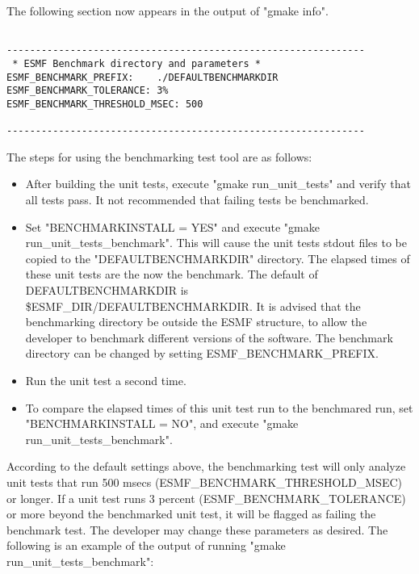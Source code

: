 The following section now appears in the output of "gmake info".

\begin{verbatim}
 
--------------------------------------------------------------
 * ESMF Benchmark directory and parameters *
ESMF_BENCHMARK_PREFIX:    ./DEFAULTBENCHMARKDIR
ESMF_BENCHMARK_TOLERANCE: 3%
ESMF_BENCHMARK_THRESHOLD_MSEC: 500
 
--------------------------------------------------------------

\end{verbatim}

The steps for using the benchmarking test tool are as follows:

\begin{sloppypar}
\begin{itemize}
\item After building the unit tests, execute "gmake run\_unit\_tests" and 
verify that all tests pass. It not recommended that failing tests be benchmarked.
\item Set "BENCHMARKINSTALL = YES" and execute "gmake run\_unit\_tests\_benchmark".
This will cause the unit tests stdout files to be copied to the "DEFAULTBENCHMARKDIR"
directory. The elapsed times of these unit tests are the now the benchmark. 
The default of DEFAULTBENCHMARKDIR is \$ESMF\_DIR/DEFAULTBENCHMARKDIR.
It is advised that the benchmarking directory be outside the ESMF structure, to allow
the developer to benchmark different versions of the software. The benchmark directory
can be changed by setting ESMF\_BENCHMARK\_PREFIX.
\item Run the unit test a second time.
\item To compare the elapsed times of this unit test run to the benchmared run, set
"BENCHMARKINSTALL = NO", and execute "gmake run\_unit\_tests\_benchmark".
\end{itemize} 

According to the default settings above, the benchmarking test will only analyze unit tests that run 
500 msecs (ESMF\_BENCHMARK\_THRESHOLD\_MSEC)
or longer. If a unit test runs 3 percent (ESMF\_BENCHMARK\_TOLERANCE) or more beyond the benchmarked
unit test, it will be flagged as failing the benchmark test. The developer may change these parameters
as desired. The following is an example of the output of running "gmake run\_unit\_tests\_benchmark":

\end{sloppypar}

